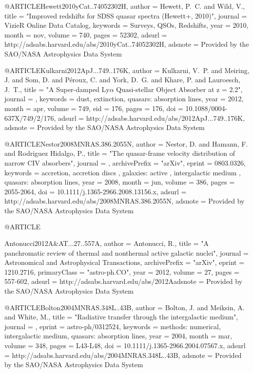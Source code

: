 \documentclass[twocolumn]{aastex62}
\begin{document}
{{{{{{{{{{{{{{{{{@ARTICLE{Hewett2010yCat..74052302H,
   author = {{Hewett}, P.~C. and {Wild}, V.},
    title = "{Improved redshifts for SDSS quasar spectra (Hewett+, 2010)}",
  journal = {VizieR Online Data Catalog},
 keywords = {Surveys, QSOs, Redshifts},
     year = 2010,
    month = nov,
   volume = 740,
    pages = {52302},
   adsurl = {http://adsabs.harvard.edu/abs/2010yCat..74052302H},
  adsnote = {Provided by the SAO/NASA Astrophysics Data System}
}

@ARTICLE{Kulkarni2012ApJ...749..176K,
   author = {{Kulkarni}, V.~P. and {Meiring}, J. and {Som}, D. and {P{\'e}roux}, C. and 
	{York}, D.~G. and {Khare}, P. and {Lauroesch}, J.~T.},
    title = "{A Super-damped Ly{$\alpha$} Quasi-stellar Object Absorber at z = 2.2}",
  journal = {\apj},
 keywords = {dust, extinction, quasars: absorption lines},
     year = 2012,
    month = apr,
   volume = 749,
      eid = {176},
    pages = {176},
      doi = {10.1088/0004-637X/749/2/176},
   adsurl = {http://adsabs.harvard.edu/abs/2012ApJ...749..176K},
  adsnote = {Provided by the SAO/NASA Astrophysics Data System}
}


@ARTICLE{Nestor2008MNRAS.386.2055N,
   author = {{Nestor}, D. and {Hamann}, F. and {Rodriguez Hidalgo}, P.},
    title = "{The quasar-frame velocity distribution of narrow CIV absorbers}",
  journal = {\mnras},
archivePrefix = "arXiv",
   eprint = {0803.0326},
 keywords = {accretion, accretion discs , galaxies: active , intergalactic medium , quasars: absorption lines},
     year = 2008,
    month = jun,
   volume = 386,
    pages = {2055-2064},
      doi = {10.1111/j.1365-2966.2008.13156.x},
   adsurl = {http://adsabs.harvard.edu/abs/2008MNRAS.386.2055N},
  adsnote = {Provided by the SAO/NASA Astrophysics Data System}
}


@ARTICLE{Antonucci2012A&AT...27..557A,
   author = {{Antonucci}, R.},
    title = "{A panchromatic review of thermal and nonthermal active galactic nuclei}",
  journal = {Astronomical and Astrophysical Transactions},
archivePrefix = "arXiv",
   eprint = {1210.2716},
 primaryClass = "astro-ph.CO",
     year = 2012,
   volume = 27,
    pages = {557-602},
   adsurl = {http://adsabs.harvard.edu/abs/2012Aadsnote = {Provided by the SAO/NASA Astrophysics Data System}
}







@ARTICLE{Bolton2004MNRAS.348L..43B,
   author = {{Bolton}, J. and {Meiksin}, A. and {White}, M.},
    title = "{Radiative transfer through the intergalactic medium}",
  journal = {\mnras},
   eprint = {astro-ph/0312524},
 keywords = {methods: numerical, intergalactic medium, quasars: absorption lines},
     year = 2004,
    month = mar,
   volume = 348,
    pages = {L43-L48},
      doi = {10.1111/j.1365-2966.2004.07567.x},
   adsurl = {http://adsabs.harvard.edu/abs/2004MNRAS.348L..43B},
  adsnote = {Provided by the SAO/NASA Astrophysics Data System}
}


}}}}}}}}}}}}}}}}}}
\end{document}
